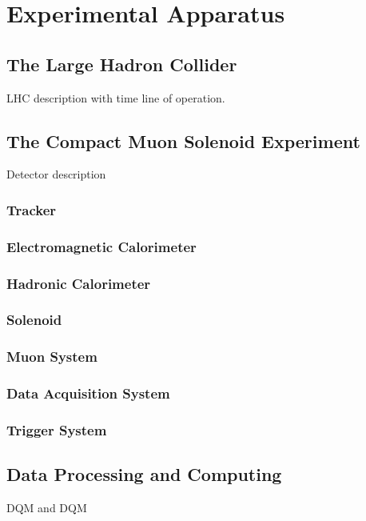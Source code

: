 \chapter{Experimental Apparatus}

\section{The Large Hadron Collider}

LHC description with time line of operation.

\section{The Compact Muon Solenoid Experiment}

Detector description

\subsection{Tracker}

\subsection{Electromagnetic Calorimeter}

\subsection{Hadronic Calorimeter}

\subsection{Solenoid}

\subsection{Muon System}

\subsection{Data Acquisition System}

\subsection{Trigger System}

\section{Data Processing and Computing}

\gls{DQM} and \gls{DQM} 


